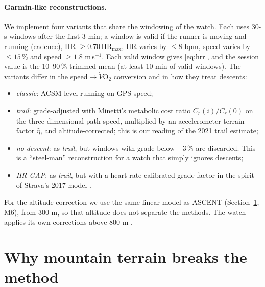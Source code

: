 \documentclass[11pt,a4paper]{article}
\newcommand{\VO}{\ensuremath{\dot V\mathrm{O}_2}}
\newcommand{\HRmax}{\ensuremath{\mathrm{HR}_{\max}}}
\newcommand{\ascent}{ASCENT}
\begin{document}
\paragraph{Garmin-like reconstructions.} We implement four variants that share the windowing of the watch. Each uses 30-s windows after the first 3 min; a window is valid if the runner is moving and running (cadence), HR $\ge 0.70\,\HRmax$, HR varies by $\le 8$ bpm, speed varies by $\le 15$\,\% and speed $\ge 1.8$ m\,s$^{-1}$. Each valid window gives \eqref{eq:hrr}, and the session value is the 10--90\,\% trimmed mean (at least 10 min of valid windows). The variants differ in the speed$\to$\VO{} conversion and in how they treat descents:
\begin{itemize}[leftmargin=*]
\item \emph{classic}: ACSM level running on GPS speed;
\item \emph{trail}: grade-adjusted with Minetti's metabolic cost ratio $C_r(i)/C_r(0)$ \citep{minetti2002} on the three-dimensional path speed, multiplied by an accelerometer terrain factor $\hat\eta$, and altitude-corrected; this is our reading of the 2021 trail estimate;
\item \emph{no-descent}: as \emph{trail}, but windows with grade below $-3$\,\% are discarded. This is a ``steel-man'' reconstruction for a watch that simply ignores descents;
\item \emph{HR-GAP}: as \emph{trail}, but with a heart-rate-calibrated grade factor in the spirit of Strava's 2017 model \citep{robb2017}.
\end{itemize}
For the altitude correction we use the same linear model as \ascent{} (Section~\ref{sec:mech}, M6), from 300 m, so that altitude does not separate the methods. The watch applies its own corrections above 800 m \citep{garmin2025}.

\section{Why mountain terrain breaks the method}\label{sec:mech}
\end{document}
